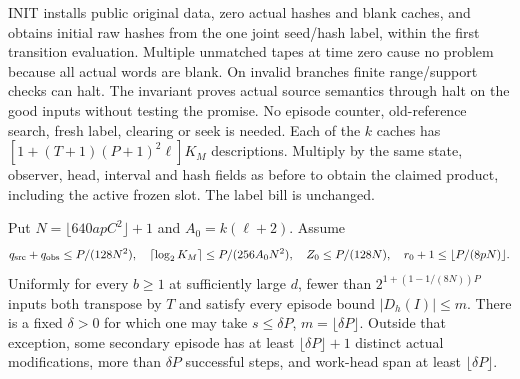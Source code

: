 \begin{informalproof}
INIT installs public original data, zero actual hashes and blank caches,
and obtains initial raw hashes from the one joint seed/hash label, within
the first transition evaluation. Multiple unmatched tapes at time zero
cause no problem because all actual words are blank. On invalid branches
finite range/support checks can halt. The invariant proves actual source
semantics through halt on the good inputs without testing the promise.
No episode counter, old-reference search, fresh label, clearing or seek is
needed. Each of the $k$ caches has
$[1+(T+1)(P+1)^2\ell]K_M$ descriptions. Multiply by the same state,
observer, head, interval and hash fields as before to obtain the claimed
product, including the active frozen slot. The label bill is unchanged.
\end{informalproof}

\begin{corollary}\label{cor:secondary-modifications}
Put $N=\lfloor640apC^2\rfloor+1$ and $A_0=k(\ell+2)$. Assume
\[
 q_{\rm src}+q_{\rm obs}\le P/(128N^2),\quad
 \lceil\log_2K_M\rceil\le P/(256A_0N^2),\quad
 Z_0\le P/(128N),\quad r_0+1\le\lfloor P/(8pN)\rfloor.
\]
Uniformly for every $b\ge1$ at sufficiently large $d$, fewer than
$2^{1+(1-1/(8N))P}$ inputs both transpose by $T$ and satisfy every episode
bound $|D_h(I)|\le m$. There is a fixed $\delta>0$ for which one may
take $s\le\delta P$, $m=\lfloor\delta P\rfloor$. Outside that exception,
some secondary episode has at least $\lfloor\delta P\rfloor+1$ distinct
actual modifications, more than $\delta P$ successful steps, and work-head
span at least $\lfloor\delta P\rfloor$.
\end{corollary}
